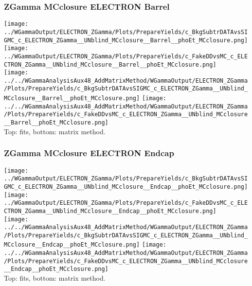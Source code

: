 \documentclass{beamer}
\begin{document}
\begin{frame}\frametitle{ZGamma MCclosure ELECTRON Barrel}
  \texttt{[image: ../WGammaOutput/ELECTRON\_ZGamma/Plots/PrepareYields/c\_BkgSubtrDATAvsSIGMC\_c\_ELECTRON\_ZGamma\_\_UNblind\_MCclosure\_\_Barrel\_\_phoEt\_MCclosure.png]} \texttt{[image: ../WGammaOutput/ELECTRON\_ZGamma/Plots/PrepareYields/c\_FakeDDvsMC\_c\_ELECTRON\_ZGamma\_\_UNblind\_MCclosure\_\_Barrel\_\_phoEt\_MCclosure.png]}\\
  \texttt{[image: ../../WGammaAnalysisAux48\_AddMatrixMethod/WGammaOutput/ELECTRON\_ZGamma/Plots/PrepareYields/c\_BkgSubtrDATAvsSIGMC\_c\_ELECTRON\_ZGamma\_\_UNblind\_MCclosure\_\_Barrel\_\_phoEt\_MCclosure.png]} \texttt{[image: ../../WGammaAnalysisAux48\_AddMatrixMethod/WGammaOutput/ELECTRON\_ZGamma/Plots/PrepareYields/c\_FakeDDvsMC\_c\_ELECTRON\_ZGamma\_\_UNblind\_MCclosure\_\_Barrel\_\_phoEt\_MCclosure.png]}\\
  \scriptsize Top: fits, bottom: matrix method.
\end{frame}

\begin{frame}\frametitle{ZGamma MCclosure ELECTRON Endcap}
  \texttt{[image: ../WGammaOutput/ELECTRON\_ZGamma/Plots/PrepareYields/c\_BkgSubtrDATAvsSIGMC\_c\_ELECTRON\_ZGamma\_\_UNblind\_MCclosure\_\_Endcap\_\_phoEt\_MCclosure.png]} \texttt{[image: ../WGammaOutput/ELECTRON\_ZGamma/Plots/PrepareYields/c\_FakeDDvsMC\_c\_ELECTRON\_ZGamma\_\_UNblind\_MCclosure\_\_Endcap\_\_phoEt\_MCclosure.png]}\\
  \texttt{[image: ../../WGammaAnalysisAux48\_AddMatrixMethod/WGammaOutput/ELECTRON\_ZGamma/Plots/PrepareYields/c\_BkgSubtrDATAvsSIGMC\_c\_ELECTRON\_ZGamma\_\_UNblind\_MCclosure\_\_Endcap\_\_phoEt\_MCclosure.png]} \texttt{[image: ../../WGammaAnalysisAux48\_AddMatrixMethod/WGammaOutput/ELECTRON\_ZGamma/Plots/PrepareYields/c\_FakeDDvsMC\_c\_ELECTRON\_ZGamma\_\_UNblind\_MCclosure\_\_Endcap\_\_phoEt\_MCclosure.png]}\\
  \scriptsize Top: fits, bottom: matrix method.
\end{frame}
\end{document}
